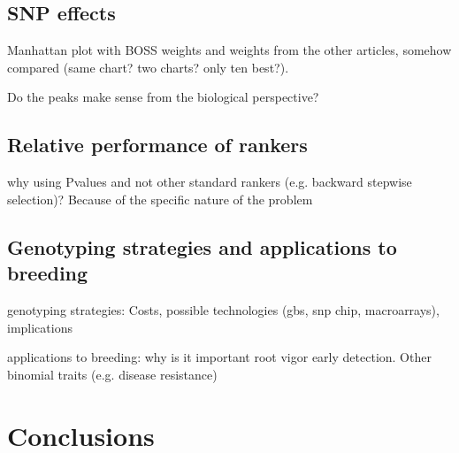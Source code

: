 \subsection{SNP effects}
Manhattan plot with BOSS weights and weights from the other articles,
somehow compared (same chart? two charts? only ten best?).

Do the peaks make sense from the biological perspective?

\subsection{Relative performance of rankers}
why using Pvalues and not other standard rankers (e.g. backward stepwise
selection)? Because of the specific nature of the problem

\subsection{Genotyping strategies and applications to breeding}
genotyping strategies: 
Costs, possible technologies (gbs, snp chip, macroarrays), implications

applications to breeding:
why is it important root vigor early detection. Other binomial traits (e.g.
disease resistance)

%

\section{Conclusions}
\label{sec:conclusions}

